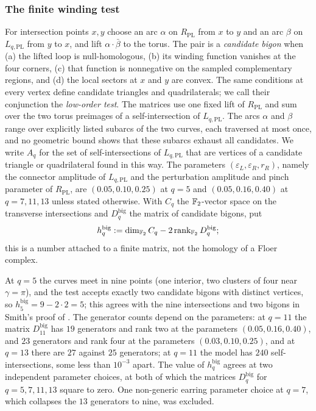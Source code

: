 \subsubsection{The finite winding test}\label{ss:polygons}
For intersection points $x,y$ choose an arc $\alpha$ on $R_{\mathrm{PL}}$ from $x$ to $y$ and an arc
$\beta$ on $L_{q,\mathrm{PL}}$ from $y$ to $x$, and lift $\alpha\cdot\bar\beta$ to the torus.  The pair is a
\emph{candidate bigon} when (a) the lifted loop is null-homologous, (b) its winding function vanishes at
the four corners, (c) that function is nonnegative on the sampled complementary regions, and (d) the
local sectors at $x$ and $y$ are convex.  The same conditions at every vertex define candidate triangles
and quadrilaterals; we call their conjunction the \emph{low-order test}.  The matrices use one
fixed lift of $R_{\mathrm{PL}}$ and sum over the two torus preimages of a self-intersection of
$L_{q,\mathrm{PL}}$.  The arcs $\alpha$ and $\beta$ range over explicitly listed subarcs of the two curves,
each traversed at most once, and no geometric bound shows that these subarcs exhaust all candidates.  We
write $A_q$ for the set of self-intersections of $L_{q,\mathrm{PL}}$ that are vertices of a candidate
triangle or quadrilateral found in this way.  The parameters $(\varepsilon_L,\varepsilon_R,r_R)$, namely
the connector amplitude of $L_{q,\mathrm{PL}}$ and the perturbation amplitude and pinch parameter of
$R_{\mathrm{PL}}$, are $(0.05,0.10,0.25)$ at $q=5$ and $(0.05,0.16,0.40)$ at $q=7,11,13$
unless stated otherwise.  With $C_q$ the $\mathbb{F}_2$-vector space on the transverse intersections and
$D_q^{\mathrm{big}}$ the matrix of candidate bigons, put
\begin{equation}\label{eq:big-stat}
 h_q^{\mathrm{big}}:=\dim_{\mathbb{F}_2}C_q-2\operatorname{rank}_{\mathbb{F}_2}D_q^{\mathrm{big}};
\end{equation}
this is a number attached to a finite matrix, not the homology of a Floer complex.

At $q=5$ the curves meet in nine points (one interior, two clusters of four near $\gamma=\pi$), and the
test accepts exactly two candidate bigons with distinct vertices, so $h_5^{\mathrm{big}}=9-2\cdot2=5$;
this agrees with the nine intersections and two bigons in Smith's proof of \cite[Thm.~5.9]{Smith}.  The
generator counts depend on the parameters: at $q=11$ the matrix $D_{11}^{\mathrm{big}}$ has $19$ generators
and rank two at the parameters $(0.05,0.16,0.40)$, and $23$ generators and rank four at the parameters $(0.03,0.10,0.25)$, and at $q=13$ there are $27$ against $25$ generators; at $q=11$ the model has $240$ self-intersections, some less than $10^{-3}$ apart.  The value of $h_q^{\mathrm{big}}$
agrees at two independent parameter choices, at both of which the matrices $D_q^{\mathrm{big}}$ for
$q=5,7,11,13$ square to zero.  One non-generic earring parameter choice at $q=7$,
which collapses the $13$ generators to nine, was excluded.

